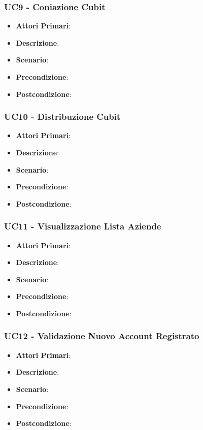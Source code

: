 \subsubsection{UC9 -  Coniazione Cubit}
\begin{itemize}
	\item \textbf{Attori Primari}:
	\item \textbf{Descrizione}:
	\item \textbf{Scenario}:
	\item \textbf{Precondizione}:
	\item \textbf{Postcondizione}:
\end{itemize}
\subsubsection{UC10 - Distribuzione Cubit}
\begin{itemize}
	\item \textbf{Attori Primari}:
	\item \textbf{Descrizione}:
	\item \textbf{Scenario}:
	\item \textbf{Precondizione}:
	\item \textbf{Postcondizione}:
\end{itemize}
\subsubsection{UC11 - Visualizzazione Lista Aziende}
\begin{itemize}
	\item \textbf{Attori Primari}:
	\item \textbf{Descrizione}:
	\item \textbf{Scenario}:
	\item \textbf{Precondizione}:
	\item \textbf{Postcondizione}:
\end{itemize}
\subsubsection{UC12 - Validazione Nuovo Account Registrato}
\begin{itemize}
	\item \textbf{Attori Primari}:
	\item \textbf{Descrizione}:
	\item \textbf{Scenario}:
	\item \textbf{Precondizione}:
	\item \textbf{Postcondizione}:
\end{itemize}
